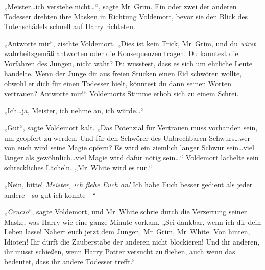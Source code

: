 „Meister…ich verstehe nicht…“, sagte Mr~Grim.
Ein oder zwei der anderen Todesser drehten ihre Masken in Richtung Voldemort, bevor sie den Blick des Totenschädels schnell auf Harry richteten.

„Antworte mir“, zischte Voldemort. „Dies ist kein Trick, Mr~Grim, und du \emph{wirst} wahrheitsgemäß antworten oder die Konsequenzen tragen. Du kanntest die Vorfahren des Jungen, nicht wahr? Du wusstest, dass es sich um ehrliche Leute handelte. Wenn der Junge dir aus freien Stücken einen Eid schwören wollte, obwohl er dich für einen Todesser hielt, könntest du dann seinen Worten vertrauen? Antworte mir!“
Voldemorts Stimme erhob sich zu einem Schrei.

„Ich…ja, Meister, ich nehme an, ich würde…“

„Gut“, sagte Voldemort kalt. „Das Potenzial für Vertrauen muss vorhanden sein, um geopfert zu werden. Und für den Schwörer des Unbrechbaren Schwurs…wer von euch wird seine Magie opfern? Es wird ein ziemlich langer Schwur sein…viel länger als gewöhnlich…viel Magie wird dafür nötig sein…“
Voldemort lächelte sein schreckliches Lächeln. „Mr~White wird es tun.“

„Nein, bitte! \emph{Meister, ich flehe Euch an!} Ich habe Euch besser gedient als jeder andere—so gut ich konnte—“

„\emph{Crucio}“, sagte Voldemort, und Mr~White schrie durch die Verzerrung seiner Maske, was Harry wie eine ganze Minute vorkam. „Sei dankbar, wenn ich dir dein Leben lasse! Nähert euch jetzt dem Jungen, Mr~Grim, Mr~White. Von hinten, Idioten! Ihr dürft die Zauberstäbe der anderen nicht blockieren! Und ihr anderen, ihr müsst schießen, wenn Harry Potter versucht zu fliehen, auch wenn das bedeutet, dass ihr andere Todesser trefft.“

